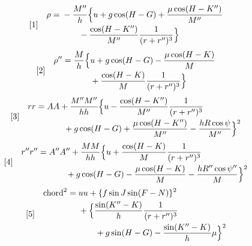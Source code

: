 \[
\begin{array}{l@{\quad}l}
[1]&\begin{aligned}
\rho={}&-\frac{M''}{h}\Bigl\{u+g\cos(H-G)+\frac{\mu\cos(H-K'')}{M''}\\
&\qquad{}-\frac{\cos(H-K'')}{M''}\frac{1}{(r+r'')^3}\Bigr\}
\end{aligned}
\end{array}
\]
\[
\begin{array}{l@{\quad}l}
[2]&\begin{aligned}
\rho''={}&\frac{M}{h}\Bigl\{u+g\cos(H-G)-\frac{\mu\cos(H-K)}{M}\\
&\qquad{}+\frac{\cos(H-K)}{M}\frac{1}{(r+r'')^3}\Bigr\}
\end{aligned}
\end{array}
\]
\[
\begin{array}{l@{\quad}l}
[3]&\begin{aligned}
rr={}&AA+\frac{M''M''}{hh}\Bigl\{u-\frac{\cos(H-K'')}{M''}\frac{1}{(r+r'')^3}\\
&\qquad{}+g\cos(H-G)+\frac{\mu\cos(H-K'')}{M''}-\frac{hR\cos\psi}{M''}\Bigr\}^2
\end{aligned}
\end{array}
\]
\[
\begin{array}{l@{\quad}l}
[4]&\begin{aligned}
r''r''={}&A''A''+\frac{MM}{hh}\Bigl\{u+\frac{\cos(H-K)}{M}\frac{1}{(r+r'')^3}\\
&\qquad{}+g\cos(H-G)-\frac{\mu\cos(H-K)}{M}-\frac{hR''\cos\psi''}{M}\Bigr\}^2
\end{aligned}
\end{array}
\]
\[
\begin{array}{l@{\quad}l}
[5]&\begin{aligned}
\text{chord}^2={}&uu+\{f\sin J\sin(F-N)\}^2\\
&+\Bigl\{\frac{\sin(K''-K)}{h}\frac{1}{(r+r'')^3}\\
&\qquad{}+g\sin(H-G)-\frac{\sin(K''-K)}{h}\mu\Bigr\}^2
\end{aligned}
\end{array}
\]

